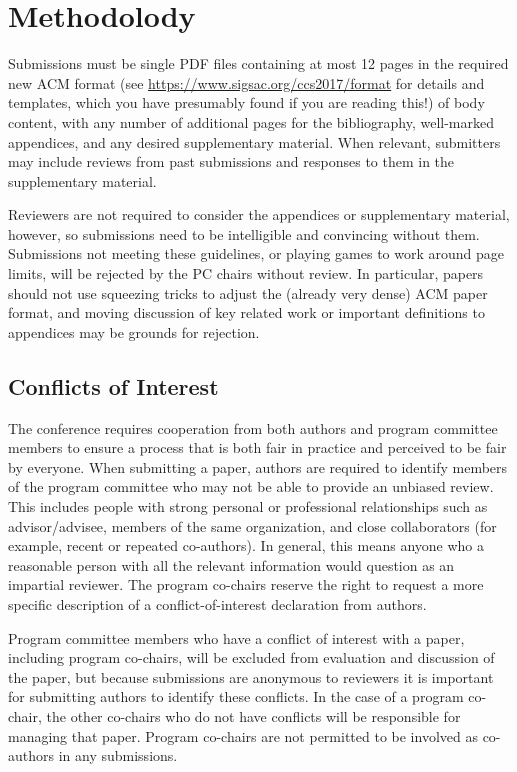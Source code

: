 \section{Methodolody}

Submissions must be single PDF files containing at most 12 pages in
the required new ACM format (see
\url{https://www.sigsac.org/ccs2017/format} for details and templates,
which you have presumably found if you are reading this!) of body
content, with any number of additional pages for the bibliography,
well-marked appendices, and any desired supplementary material.  When
relevant, submitters may include reviews from past submissions and
responses to them in the supplementary material.

Reviewers are not required to consider the appendices or supplementary
material, however, so submissions need to be intelligible and
convincing without them.  Submissions not meeting these guidelines, or
playing games to work around page limits, will be rejected by the PC
chairs without review.  In particular, papers should not use squeezing
tricks to adjust the (already very dense) ACM paper format, and moving
discussion of key related work or important definitions to appendices
may be grounds for rejection.

\subsection{Conflicts of Interest}

The conference requires cooperation from both authors and program
committee members to ensure a process that is both fair in practice
and perceived to be fair by everyone. When submitting a paper, authors
are required to identify members of the program committee who may not
be able to provide an unbiased review.  This includes people with
strong personal or professional relationships such as advisor/advisee,
members of the same organization, and close collaborators (for
example, recent or repeated co-authors). In general, this means anyone
who a reasonable person with all the relevant information would
question as an impartial reviewer. The program co-chairs reserve the
right to request a more specific description of a conflict-of-interest
declaration from authors.

Program committee members who have a conflict of interest with a
paper, including program co-chairs, will be excluded from evaluation
and discussion of the paper, but because submissions are anonymous to
reviewers it is important for submitting authors to identify these
conflicts. In the case of a program co-chair, the other co-chairs who
do not have conflicts will be responsible for managing that paper.
Program co-chairs are not permitted to be involved as co-authors in
any submissions.
